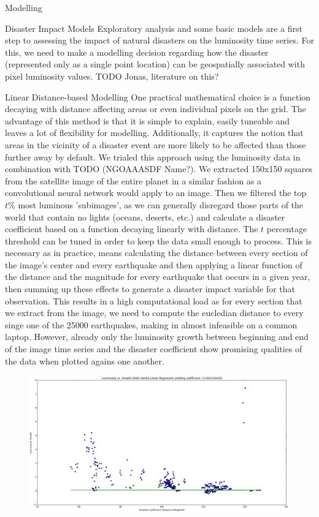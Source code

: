 \documentclass[12pt,fleqn,leqno,letterpaper]{article}
\begin{document}
\begin{section}{Modelling}
  \begin{subsection}{Disaster Impact Models}
    Exploratory analysis and some basic models are a first step to assessing the impact of natural disasters on the luminosity time series. For this, we need to make a modelling decision regarding how the disaster (represented only as a single point location) can be geospatially associated with pixel luminosity values. TODO Jonas, literature on this?
    \begin{subsubsection}{Linear Distance-based Modelling}
      One practical mathematical choice is a function decaying with distance affecting areas or even individual pixels on the grid. The advantage of this method is that it is simple to explain, easily tuneable and leaves a lot of flexibility for modelling. Additionally, it captures the notion that areas in the vicinity of a disaster event are more likely to be affected than those further away by default.
      We trialed this approach using the luminosity data in combination with TODO (NGOAAASDF Name?). We extracted 150x150 squares from the satellite image of the entire planet in a similar fashion as a convolutional neural network would apply to an image. Then we filtered the top $t\%$ most luminous 'subimages', as we can generally disregard those parts of the world that contain no lights (oceans, deserts, etc.) and calculate a disaster coefficient based on a function decaying linearly with distance. The $t$ percentage threshold can be tuned in order to keep the data small enough to process. This is necessary as in practice,  means calculating the distance between every section of the image's center and every earthquake and then applying a linear function of the distance and the magnitude for every earthquake that occurs in a given year, then summing up these effects to generate a disaster impact variable for that observation. This results in a high computational load as for every section that we extract from the image, we need to compute the eucledian distance to every singe one of the 25000 earthquakes, making in almost infeasible on a common laptop. However, already only the luminosity growth between beginning and end of the image time series and the disaster coefficient show promising qualities of the data when plotted agains one another.
      \begin{figure}
        \centering
        \includegraphics[width=1\linewidth]{linear-model-1}\label{fig:linear-model-disco-vs-lum-growth} %

\end{figure}
\end{subsubsection}
\end{subsection}
\end{section}
\end{document}
